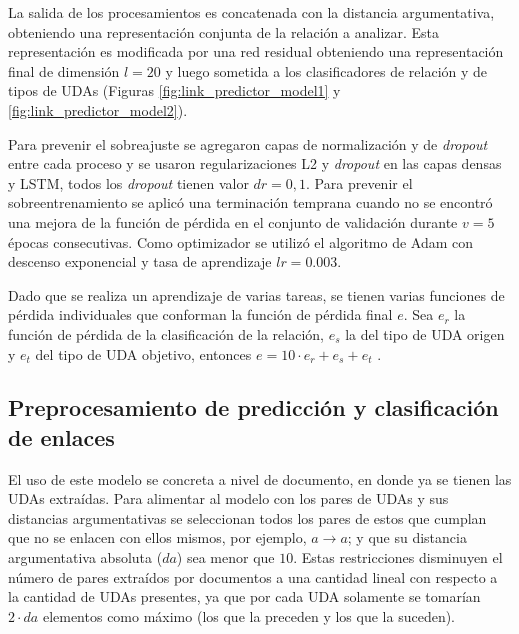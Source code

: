 \documentclass[a4paper,11pt,twocolumn,twoside]{article}
\begin{document}
La salida de los procesamientos es concatenada con la distancia argumentativa, obteniendo una representación 
conjunta de la relación a analizar. Esta representación es modificada por una red residual obteniendo
una representación final de dimensión $l=20$ y luego sometida a los clasificadores de relación y de tipos de UDAs
(Figuras \ref{fig:link_predictor_model1} y \ref{fig:link_predictor_model2}).

Para prevenir el sobreajuste se agregaron capas de normalización y de \textit{dropout} entre cada 
proceso y se usaron regularizaciones L2 y \textit{dropout} en las capas densas y LSTM, 
todos los \textit{dropout} tienen valor $dr=0,1$. Para prevenir el sobreentrenamiento se aplicó una 
terminación temprana cuando no se encontró una mejora de la función de pérdida en el 
conjunto de validación durante $v=5$ épocas consecutivas. Como optimizador se utilizó el algoritmo de Adam con descenso 
exponencial y tasa de aprendizaje $lr=0.003$.

Dado que se realiza un aprendizaje de varias tareas, se tienen varias funciones de pérdida individuales que conforman 
la función de pérdida final $e$. Sea $e_r$ la función de pérdida de la clasificación de la relación, $e_s$ la del tipo de UDA origen  
y $e_t$ del tipo de UDA objetivo, entonces $e = 10 \cdot e_r + e_s + e_t$ \cite{galassi2021deep}.

\subsection{Preprocesamiento de predicción y clasificación de enlaces}

El uso de este modelo se concreta a nivel de documento, en donde ya se tienen las UDAs extraídas. Para alimentar
al modelo con los pares de UDAs y sus distancias argumentativas se seleccionan todos los pares de estos que cumplan
que no se enlacen con ellos mismos, por ejemplo, $a \rightarrow a$; y que su distancia argumentativa absoluta ($da$) sea menor 
que $10$. Estas restricciones disminuyen el número de pares extraídos por documentos a una cantidad lineal 
con respecto a la cantidad de UDAs presentes, ya que por cada UDA solamente se tomarían $2 \cdot da$ elementos como máximo
(los que la preceden y los que la suceden). 
\end{document}
